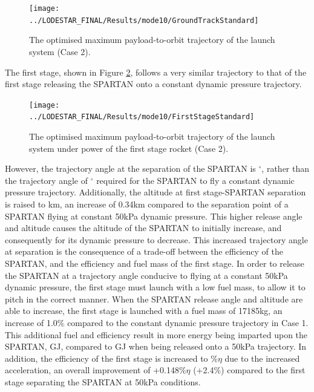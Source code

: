 \begin{figure}[ht!]
	
	
	
	\centering
	\texttt{[image: ../LODESTAR\_FINAL/Results/mode10/GroundTrackStandard]}
	\caption{The optimised maximum payload-to-orbit trajectory of the launch system (Case 2).}
	\label{fig:GroundTrackStandardNoReturn}
\end{figure}


The first stage, shown in Figure \ref{fig:FirstStageStandardNoReturn}, follows a very similar trajectory to that of the first stage releasing the SPARTAN onto a constant dynamic pressure trajectory.
\begin{figure}[ht!]
	\centering
	\texttt{[image: ../LODESTAR\_FINAL/Results/mode10/FirstStageStandard]}
	\caption{The optimised maximum payload-to-orbit trajectory of the launch system under power of the first stage rocket (Case 2).}
	\label{fig:FirstStageStandardNoReturn}
\end{figure}
 However, the trajectory angle at the separation of the SPARTAN is \secondthirdSeparationgammaqStandardNoReturn$^\circ$, rather than the trajectory angle of \secondthirdSeparationgammaConstqNoReturn$^\circ$ required for the SPARTAN to fly a constant dynamic pressure trajectory. Additionally, the altitude at first stage-SPARTAN separation is raised to \firstsecondSeparationAltStandardNoReturn km, an increase of 0.34km compared to the separation point of a SPARTAN flying at constant 50kPa dynamic pressure. This higher release angle and altitude causes the altitude of the SPARTAN to initially increase, and consequently for its dynamic pressure to decrease. This increased trajectory angle at separation is the consequence of a trade-off between the efficiency of the SPARTAN, and the efficiency and fuel mass of the first stage. 
 In order to release the SPARTAN at a trajectory angle conducive to flying at a constant 50kPa dynamic pressure, the first stage must launch with a low fuel mass, to allow it to pitch in the correct manner. When the SPARTAN release angle and altitude are able to increase, the first stage is launched with a fuel mass of 17185kg, an increase of 1.0\% compared to the constant dynamic pressure trajectory in Case 1. This additional fuel and efficiency result in more energy being imparted upon the SPARTAN, \firstdExergyStandardNoReturn GJ, compared to \firstdExergyConstqNoReturn GJ when being released onto a 50kPa trajectory. 
 In addition, the efficiency of the first stage is increased to \firstExergyEffStandardNoReturn\%$\eta$ due to the increased acceleration, an overall improvement of +0.148\%$\eta$ (+2.4\%) compared to the first stage separating the SPARTAN at 50kPa conditions. 
